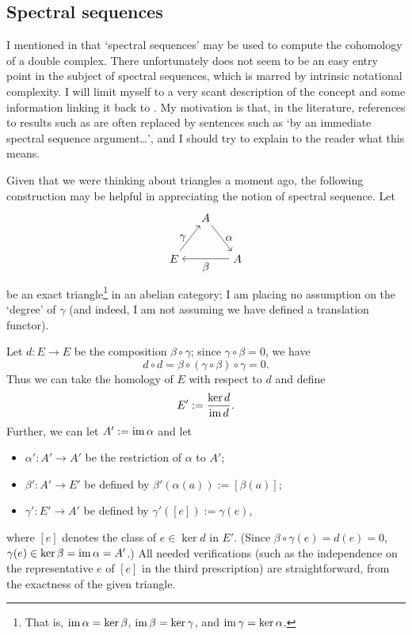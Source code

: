 \subsection{Spectral sequences}
\label{subsec:homol:spectral-sequences}
I mentioned in 
that `spectral sequences' may be used to compute the cohomology of a
double complex. There unfortunately does not seem to be an easy entry
point in the subject of spectral sequences, which is marred by
intrinsic notational complexity. I will limit myself to a very scant
description of the concept and some information linking it back to
. My motivation
is that, in the literature, references to results such as
 are often replaced by sentences such as `by an
immediate spectral sequence argument\dots', and I should try to
explain to the reader what this means.

Given that we were thinking about triangles a moment ago, the
following construction may be helpful in appreciating the notion of
spectral sequence. Let
\[
  \begin{tikzpicture}[baseline=(current bounding box.center)]
    \node (A) at (1,1.3) {$A$}; \node (E) at (0,0)
    {$E$}; \node (A2) at (2,0)
    {$A$}; \draw[->] (A) -- (A2) node[midway, right]
    {$\alpha$}; \draw[->] (A2) -- (E) node[midway, below]
    {$\beta$}; \draw[->] (E) -- (A) node[midway, left] {$\gamma$};
  \end{tikzpicture}
\]
be an exact triangle\footnote{That is, $\operatorname{im}\alpha = \ker\beta$,
  $\operatorname{im}\beta = \ker\gamma$, and $\operatorname{im}\gamma = \ker\alpha$.} in an
abelian category; I am placing no assumption on the `degree' of
$\gamma$ (and indeed, I am not assuming we have defined a translation
functor).

Let $d : E \to E$ be the composition $\beta \circ \gamma$; since
$\gamma \circ \beta = 0$, we have
\[
  d \circ d = \beta \circ (\gamma \circ \beta) \circ \gamma = 0.
\]
Thus we can take the homology of $E$ with respect to $d$ and define
\[
  E' := \frac{\ker d}{\operatorname{im} d}.
\]
Further, we can let $A' := \operatorname{im}\alpha$ and let
\begin{itemize}
\item $\alpha' : A' \to A'$ be the restriction of $\alpha$ to $A'$;
\item $\beta' : A' \to E'$ be defined by
  $\beta'(\alpha(a)) := [\beta(a)]$;
\item $\gamma' : E' \to A'$ be defined by $\gamma'([e]) := \gamma(e)$,
\end{itemize}
where $[e]$ denotes the class of $e \in \ker d$ in $E'$. (Since
$\beta \circ \gamma(e) = d(e) = 0$,
$\gamma(e) \in \ker\beta = \operatorname{im}\alpha = A'$.) All needed
verifications (such as the independence on the representative $e$ of
$[e]$ in the third prescription) are straightforward, from the
exactness of the given triangle.

